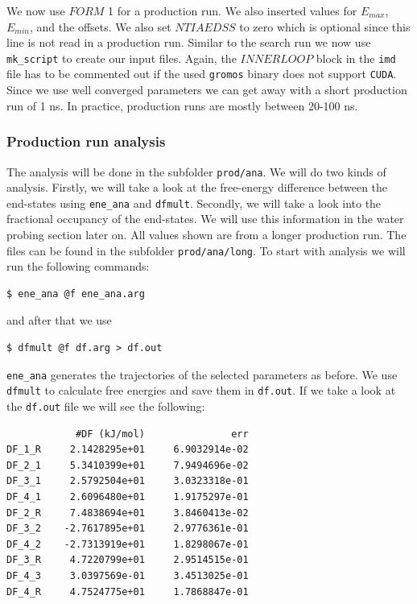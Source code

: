 We now use $FORM$ 1 for a production run. We also inserted values for $E_{max}$, $E_{min}$, and the offsets. We also set $NTIAEDSS$ to zero which is optional since this line is not read in a production run. Similar to the search run we now use \texttt{mk\_script} to create our input files. Again, the $INNERLOOP$ block in the \texttt{imd} file has to be commented out if the used \texttt{gromos} binary does not support \texttt{CUDA}.
Since we use well converged parameters we can get away with a short production run of 1 ns. In practice, production runs are mostly between 20-100 ns.

\subsubsection{Production run analysis}
The analysis will be done in the subfolder \texttt{prod/ana}. We will do two kinds of analysis. Firstly, we will take a look at the free-energy difference between the end-states using \texttt{ene\_ana} and \texttt{dfmult}. Secondly, we will take a look into the fractional occupancy of the end-states. We will use this information in the water probing section later on. All values shown are from a longer production run. The files can be found in the subfolder \texttt{prod/ana/long}. To start with analysis we will run the following commands:

\begin{lstlisting}
$ ene_ana @f ene_ana.arg
\end{lstlisting}

and after that we use

\begin{lstlisting}
$ dfmult @f df.arg > df.out
\end{lstlisting}

\texttt{ene\_ana} generates the trajectories of the selected parameters as before. We use \texttt{dfmult} to calculate free energies and save them in \texttt{df.out}. If we take a look at the \texttt{df.out} file we will see the following:

\begin{lstlisting}
            #DF (kJ/mol)               err
DF_1_R     2.1428295e+01     6.9032914e-02
DF_2_1     5.3410399e+01     7.9494696e-02
DF_3_1     2.5792504e+01     3.0323318e-01
DF_4_1     2.6096480e+01     1.9175297e-01
DF_2_R     7.4838694e+01     3.8460413e-02
DF_3_2    -2.7617895e+01     2.9776361e-01
DF_4_2    -2.7313919e+01     1.8298067e-01
DF_3_R     4.7220799e+01     2.9514515e-01
DF_4_3     3.0397569e-01     3.4513025e-01
DF_4_R     4.7524775e+01     1.7868847e-01
\end{lstlisting}

